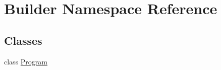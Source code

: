 \hypertarget{namespace_builder}{}\section{Builder Namespace Reference}
\label{namespace_builder}
\subsection*{Classes}
\begin{DoxyCompactItemize}
\item 
class \hyperlink{class_builder_1_1_program}{Program}
\end{DoxyCompactItemize}
